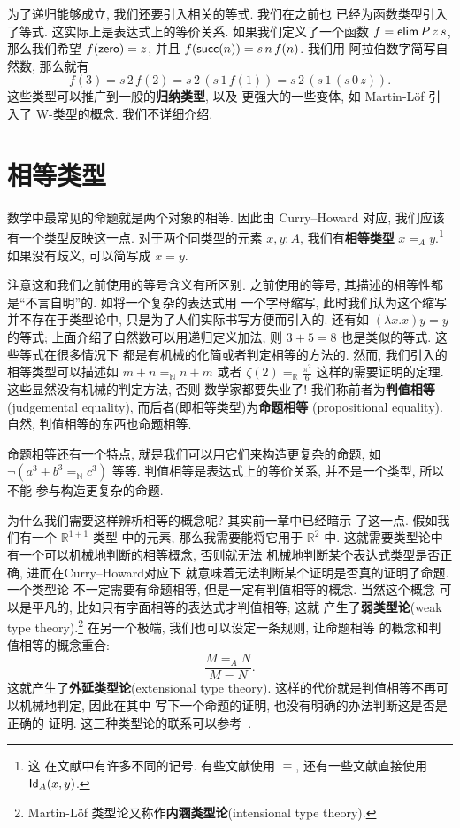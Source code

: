 为了递归能够成立, 我们还要引入相关的等式. 我们在之前也
已经为函数类型引入了等式. 这实际上是表达式上的等价关系.
如果我们定义了一个函数 \(f = \textsf{elim}\,P\,z\,s\),
那么我们希望 \(f(\textsf{zero}) = z\), 并且
\(f(\textsf{succ}(n)) = s\,n\,f(n)\). 我们用
阿拉伯数字简写自然数, 那么就有
\[f(3) = s\,2\,f(2) = s\,2\,(s\,1\,f(1)) = s\,2\,(s\,1\,(s\,0\,z)).\]
这些类型可以推广到一般的\textbf{归纳类型}, 以及
更强大的一些变体, 如 Martin-L\"of 引入了 W-类型的概念.
我们不详细介绍.

\section{相等类型}
数学中最常见的命题就是两个对象的相等. 因此由 Curry--Howard
对应, 我们应该有一个类型反映这一点. 对于两个同类型的元素
\(x,y : A\), 我们有\textbf{相等类型} \(x =_A y\).\footnote{这
在文献中有许多不同的记号. 有些文献使用 \(\equiv\),
还有一些文献直接使用 \(\textsf{Id}_A(x,y)\).}
如果没有歧义, 可以简写成 \(x = y\).

注意这和我们之前使用的等号含义有所区别. 之前使用的等号,
其描述的相等性都是“不言自明”的. 如将一个复杂的表达式用
一个字母缩写, 此时我们认为这个缩写并不存在于类型论中,
只是为了人们实际书写方便而引入的. 还有如 \((\lambda x.x)y = y\)
的等式; 上面介绍了自然数可以用递归定义加法, 则
\(3 + 5 = 8\) 也是类似的等式. 这些等式在很多情况下
都是有机械的化简或者判定相等的方法的. 然而, 我们引入的
相等类型可以描述如 \(m + n =_{\mathbb N} n + m\) 或者 \(\zeta(2) =_{\mathbb R} \frac{\pi^2}{6}\)
这样的需要证明的定理. 这些显然没有机械的判定方法, 否则
数学家都要失业了!
我们称前者为\textbf{判值相等} (judgemental equality),
而后者(即相等类型)为\textbf{命题相等} (propositional equality).
自然, 判值相等的东西也命题相等.

命题相等还有一个特点, 就是我们可以用它们来构造更复杂的命题,
如 \(\neg (a^3 + b^3 =_{\mathbb N} c^3)\) 等等.
判值相等是表达式上的等价关系, 并不是一个类型, 所以不能
参与构造更复杂的命题.

为什么我们需要这样辨析相等的概念呢? 其实前一章中已经暗示
了这一点. 假如我们有一个 \(\mathbb R^{1+1}\) 类型
中的元素, 那么我需要能将它用于 \(\mathbb R^2\) 中.
这就需要类型论中有一个可以机械地判断的相等概念, 否则就无法
机械地判断某个表达式类型是否正确, 进而在Curry--Howard对应下
就意味着无法判断某个证明是否真的证明了命题. 一个类型论
不一定需要有命题相等, 但是一定有判值相等的概念. 当然这个概念
可以是平凡的, 比如只有字面相等的表达式才判值相等; 这就
产生了\textbf{弱类型论}(weak type theory).\footnote{Martin-L\"of
类型论又称作\textbf{内涵类型论}(intensional
type theory).} 在另一个极端, 我们也可以设定一条规则, 让命题相等
的概念和判值相等的概念重合:
\[\frac{M =_A N}{M = N}.\]
这就产生了\textbf{外延类型论}(extensional type theory).
这样的代价就是判值相等不再可以机械地判定, 因此在其中
写下一个命题的证明, 也没有明确的办法判断这是否是正确的
证明. 这三种类型论的联系可以参考~\cite{winterhalter:2018:ettwtt}.

